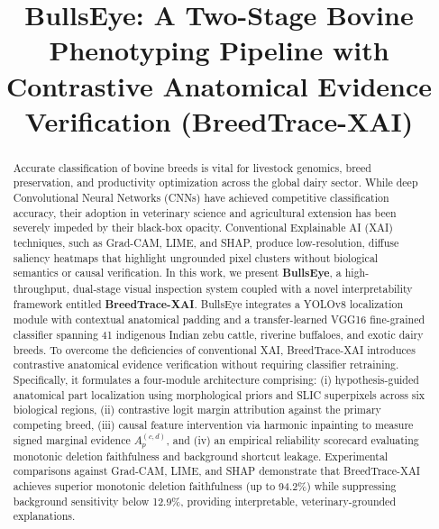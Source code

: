 \documentclass[conference]{IEEEtran}
\begin{document}
\title{BullsEye: A Two-Stage Bovine Phenotyping Pipeline with Contrastive Anatomical Evidence Verification (BreedTrace-XAI)\\
}

\author{
}

\maketitle

\begin{abstract}
Accurate classification of bovine breeds is vital for livestock genomics, breed preservation, and productivity optimization across the global dairy sector. While deep Convolutional Neural Networks (CNNs) have achieved competitive classification accuracy, their adoption in veterinary science and agricultural extension has been severely impeded by their black-box opacity. Conventional Explainable AI (XAI) techniques, such as Grad-CAM, LIME, and SHAP, produce low-resolution, diffuse saliency heatmaps that highlight ungrounded pixel clusters without biological semantics or causal verification. In this work, we present \textbf{BullsEye}, a high-throughput, dual-stage visual inspection system coupled with a novel interpretability framework entitled \textbf{BreedTrace-XAI}. BullsEye integrates a YOLOv8 localization module with contextual anatomical padding and a transfer-learned VGG16 fine-grained classifier spanning 41 indigenous Indian zebu cattle, riverine buffaloes, and exotic dairy breeds. To overcome the deficiencies of conventional XAI, BreedTrace-XAI introduces contrastive anatomical evidence verification without requiring classifier retraining. Specifically, it formulates a four-module architecture comprising: (i) hypothesis-guided anatomical part localization using morphological priors and SLIC superpixels across six biological regions, (ii) contrastive logit margin attribution against the primary competing breed, (iii) causal feature intervention via harmonic inpainting to measure signed marginal evidence $A_p^{(c,d)}$, and (iv) an empirical reliability scorecard evaluating monotonic deletion faithfulness and background shortcut leakage. Experimental comparisons against Grad-CAM, LIME, and SHAP demonstrate that BreedTrace-XAI achieves superior monotonic deletion faithfulness (up to 94.2\%) while suppressing background sensitivity below 12.9\%, providing interpretable, veterinary-grounded explanations.
\end{abstract}
\end{document}
